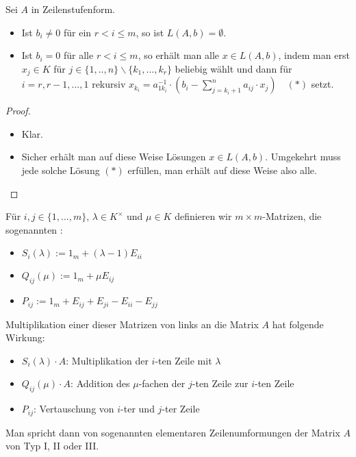 \begin{proposition}
	Sei $A$ in Zeilenstufenform.
	\begin{itemize}
		\item Ist $b_i\neq 0$ für ein $r<i\le m$, so ist $L(A,b)=\emptyset$.
		\item Ist $b_i=0$ für alle $r<i\le m$, so erhält man alle $x\in L(A,b)$, indem man erst $x_j\in K$ für $j\in \{1,..,n\}
		\backslash \{k_1,...,k_r\}$ beliebig wählt und dann für $i=r,r-1,...,1$ rekursiv $x_{k_{i}}=a_{1k_{i}}^{-1}\cdot (b_i-\sum
		_{j=k_i+1}^n a_{ij}\cdot x_j)\quad (*)$ setzt.
	\end{itemize}
\end{proposition}
\begin{proof}
	\begin{itemize}
		\item Klar.
		\item Sicher erhält man auf diese Weise Lösungen $x\in L(A,b)$. Umgekehrt muss jede solche Lösung $(*)$ erfüllen, man erhält auf 
		diese Weise also alle.
	\end{itemize}
\end{proof}

\begin{definition}[Elementarmatrizen]
	Für $i,j\in \{1,...,m\}$, $\lambda \in K^{\times}$ und $\mu\in K$ definieren wir 
	$m\times m$-Matrizen, die sogenannten :
	\begin{itemize}
		\item $S_i(\lambda):=1_m + (\lambda-1)E_{ii}$
		\item $Q_{ij}(\mu):= 1_m + \mu E_{ij}$
		\item $P_{ij}:= 1_m + E_{ij} + E_{ji} - E_{ii} - E_{jj}$
	\end{itemize}
\end{definition}

\begin{remark}
	Multiplikation einer dieser Matrizen von links an die Matrix $A$ hat folgende Wirkung:
	\begin{itemize}
		\item $S_i(\lambda)\cdot A$: Multiplikation der $i$-ten Zeile mit $\lambda$
		\item $Q_{ij}(\mu)\cdot A$: Addition des $\mu$-fachen der $j$-ten Zeile zur $i$-ten Zeile
		\item $P_{ij}$: Vertauschung von $i$-ter und $j$-ter Zeile
	\end{itemize}
	Man spricht dann von sogenannten elementaren Zeilenumformungen der Matrix $A$ von Typ I, II oder III.
\end{remark}


